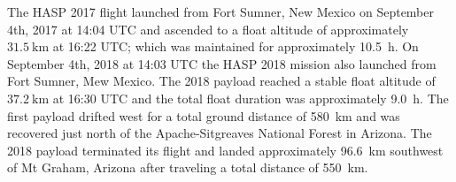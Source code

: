 The HASP 2017 flight launched from Fort Sumner, New Mexico on September 4th, 2017 at 14:04 UTC and ascended to a float altitude of approximately $\SI{31.5}{\kilo\meter}$ at 16:22 UTC; which was maintained for approximately \SI{10.5}{\hour}. On September 4th, 2018 at 14:03 UTC the HASP 2018 mission also launched from Fort Sumner, Mew Mexico.  The 2018 payload reached a stable float altitude of $\SI{37.2}{\kilo\meter}$ at 16:30 UTC and the total float duration was approximately \SI{9.0}{\hour}. The first payload drifted west for a total ground distance of \SI{580}{\kilo\meter} and was recovered just north of the Apache-Sitgreaves National Forest in Arizona. The 2018 payload terminated its flight and landed approximately \SI{96.6}{\kilo\meter} southwest of Mt Graham, Arizona after traveling a total distance of \SI{550}{\kilo\meter}.
%
%
%
%
%
%
%
%
%

